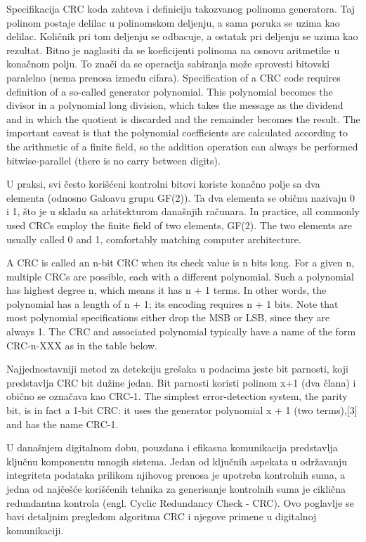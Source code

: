 \documentclass[12pt,oneside]{memoir}
\begin{document}
Specifikacija CRC koda zahteva i definiciju takozvanog polinoma generatora. Taj polinom postaje delilac u polinomskom deljenju, a sama poruka se uzima kao delilac. Količnik pri tom deljenju se odbacuje, a ostatak pri deljenju se uzima kao rezultat. Bitno je naglasiti da se koeficijenti polinoma na osnovu aritmetike u konačnom polju. To znači da se operacija sabiranja može sprovesti bitovski paralelno (nema prenosa između cifara). 
Specification of a CRC code requires definition of a so-called generator polynomial. This 
polynomial becomes the divisor in a polynomial long division, which takes the message as the 
dividend and in which the quotient is discarded and the remainder becomes the result. The 
important caveat is that the polynomial coefficients are calculated according to the arithmetic 
of a finite field, so the addition operation can always be performed bitwise-parallel (there is 
no carry between digits).

U praksi, svi često korišćeni kontrolni bitovi koriste konačno polje sa dva elementa (odnosno Galoavu grupu GF(2)). Ta dva elementa se običnu nazivaju 0 i 1, što je u skladu sa arhitekturom današnjih računara. 
In practice, all commonly used CRCs employ the finite field of two elements, GF(2). The two 
elements are usually called 0 and 1, comfortably matching computer architecture.

A CRC is called an n-bit CRC when its check value is n bits long. For a given n, multiple CRCs 
are possible, each with a different polynomial. Such a polynomial has highest degree n, which 
means it has n + 1 terms. In other words, the polynomial has a length of n + 1; its encoding 
requires n + 1 bits. Note that most polynomial specifications either drop the MSB or LSB, since 
they are always 1. The CRC and associated polynomial typically have a name of the form CRC-n-XXX 
as in the table below.

Najjednostavniji metod za detekciju grešaka u podacima jeste bit parnosti, koji predstavlja CRC bit dužine jedan. Bit parnosti koristi polinom x+1 (dva člana) i obično se označava kao CRC-1.
The simplest error-detection system, the parity bit, is in fact a 1-bit CRC: it uses the 
generator polynomial x + 1 (two terms),[3] and has the name CRC-1. 

U današnjem digitalnom dobu, pouzdana i efikasna komunikacija predstavlja ključnu 
komponentu mnogih sistema. Jedan od ključnih aspekata u održavanju integriteta 
podataka prilikom njihovog prenosa je upotreba kontrolnih suma, a jedna od najčešće korišćenih 
tehnika za generisanje kontrolnih suma je ciklična redundantna kontrola (engl. Cyclic Redundancy 
Check - CRC). Ovo poglavlje se bavi detaljnim pregledom algoritma CRC i njegove primene u 
digitalnoj komunikaciji.
\end{document}
